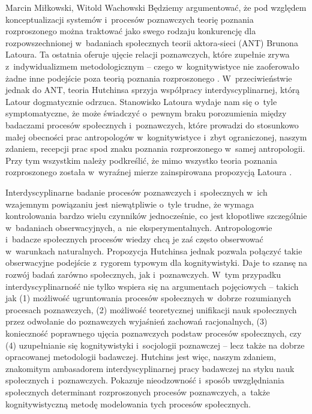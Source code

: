 \begin{artplenv2auth}{Marcin Miłkowski, Witold Wachowski}
Będziemy argumentować, że pod względem konceptualizacji systemów i~procesów poznawczych teorię poznania rozproszonego można traktować jako swego rodzaju konkurencję dla rozpowszechnionej w~badaniach społecznych teorii aktora-sieci (ANT) Brunona Latoura. Ta ostatnia oferuje ujęcie relacji poznawczych, które zupełnie zrywa z~indywidualizmem metodologicznym -- czego w~kognitywistyce nie zaoferowało żadne inne podejście poza teorią poznania rozproszonego
\parencite[co wykazano w:][]{wachowski_poznanie_2022}. %
 W~przeciwieństwie jednak do ANT, teoria Hutchinsa sprzyja współpracy interdyscyplinarnej, którą Latour dogmatycznie odrzuca. Stanowisko Latoura wydaje nam się o~tyle symptomatyczne, że może świadczyć o~pewnym braku porozumienia między badaczami procesów społecznych i~poznawczych, które prowadzi do stosunkowo małej obecności prac antropologów w~kognitywistyce 
\parencite[][]{nunez_what_2019} %
 i~zbyt ograniczonej, naszym zdaniem, recepcji prac spod znaku poznania rozproszonego w~samej antropologii. Przy tym wszystkim należy podkreślić, że mimo wszystko teoria poznania rozproszonego została w~wyraźnej mierze zainspirowana propozycją Latoura 
\parencite[zob. np.][]{hutchins_cognition_2001}.%

\enlargethispage{2\baselineskip}

Interdyscyplinarne badanie procesów poznawczych i~społecznych w~ich wzajemnym powiązaniu jest niewątpliwie o~tyle trudne, że wymaga kontrolowania bardzo wielu czynników jednocześnie, co jest kłopotliwe szczególnie w~badaniach obserwacyjnych, a~nie eksperymentalnych. Antropologowie i~badacze społecznych procesów wiedzy chcą je zaś często obserwować w~warunkach naturalnych. Propozycja Hutchinsa jednak pozwala połączyć takie obserwacyjne podejście z~rygorem typowym dla kognitywistyki. Daje to szansę na rozwój badań zarówno społecznych, jak i~poznawczych. W~tym przypadku interdyscyplinarność nie tylko wspiera się na argumentach pojęciowych -- takich jak (1) możliwość ugruntowania procesów społecznych w~dobrze rozumianych procesach poznawczych, (2) możliwość teoretycznej unifikacji nauk społecznych przez odwołanie do poznawczych wyjaśnień zachowań racjonalnych, (3) konieczność poprawnego ujęcia poznawczych podstaw procesów społecznych, czy (4) uzupełnianie się kognitywistyki i~socjologii poznawczej
\parencite[por.][]{kaidesoja_arguments_2019} %
 -- lecz także na dobrze opracowanej metodologii badawczej. Hutchins jest więc, naszym zdaniem, znakomitym ambasadorem interdyscyplinarnej pracy badawczej na styku nauk społecznych i~poznawczych. Pokazuje nieodzowność i~sposób uwzględniania społecznych determinant rozproszonych procesów poznawczych, a~także kognitywistyczną metodę modelowania tych procesów społecznych.


\end{artplenv2auth}
